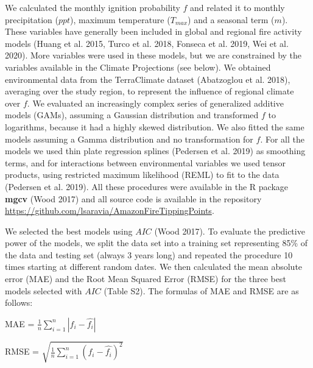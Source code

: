 \documentclass[
]{article}
\begin{document}
We calculated the monthly ignition probability \(f\) and related it to
monthly precipitation (\(ppt\)), maximum temperature (\(T_{max}\)) and a
seasonal term (\(m\)). These variables have generally been included in
global and regional fire activity models (Huang et al. 2015, Turco et
al. 2018, Fonseca et al. 2019, Wei et al. 2020). More variables were
used in these models, but we are constrained by the variables available
in the Climate Projections (see below). We obtained environmental data
from the TerraClimate dataset (Abatzoglou et al. 2018), averaging over
the study region, to represent the influence of regional climate over
\(f\). We evaluated an increasingly complex series of generalized
additive models (GAMs), assuming a Gaussian distribution and transformed
\(f\) to logarithms, because it had a highly skewed distribution. We
also fitted the same models assuming a Gamma distribution and no
transformation for \(f\). For all the models we used thin plate
regression splines (Pedersen et al. 2019) as smoothing terms, and for
interactions between environmental variables we used tensor products,
using restricted maximum likelihood (REML) to ﬁt to the data (Pedersen
et al. 2019). All these procedures were available in the R package
\textbf{mgcv} (Wood 2017) and all source code is available in the
repository \url{https://github.com/lsaravia/AmazonFireTippingPoints}.

We selected the best models using \(AIC\) (Wood 2017). To evaluate the
predictive power of the models, we split the data set into a training
set representing 85\% of the data and testing set (always 3 years long)
and repeated the procedure 10 times starting at different random dates.
We then calculated the mean absolute error (MAE) and the Root Mean
Squared Error (RMSE) for the three best models selected with \(AIC\)
(Table S2). The formulas of MAE and RMSE are as follows:

MAE = \(\frac{1}{n} \sum_{i=1}^n |f_i - \hat{f_i}|\)

RMSE = \(\sqrt{\frac{1}{n} \sum_{i=1}^n (f_i - \hat{f_i})^2}\)
\end{document}
